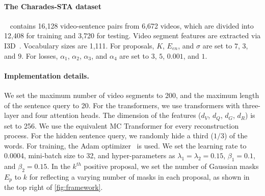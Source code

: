 \paragraph{The Charades-STA dataset}~\cite{gao2017tall}
contains 16,128 video-sentence pairs from 6,672 videos, which are divided into 12,408 for training and 3,720 for testing.
Video segment features are extracted via I3D~\cite{carreira2017quo}.
Vocabulary sizes are 1,111.
For proposals, $K$, $E_{en}$, and $\sigma$ are set to $7$, $3$, and $9$.
For losses, $\alpha_1$, $\alpha_2$, $\alpha_3$, and $\alpha_4$ are set to $3$, $5$, $0.001$, and $1$.

\paragraph{Implementation details.} We set the maximum number of video segments to 200, and the maximum length of the sentence query to 20.
For the transformers, we use transformers with three-layer and four attention heads.
The dimension of the features ($d_V$, $d_Q$, $d_G$, $d_R$) is set to 256.
We use the equivalent MC Transformer for every reconstruction process.
For the hidden sentence query, we randomly hide a third ($1/3$) of the words.
For training, the Adam optimizer~\cite{kingma2014adam} is used.
We set the learning rate to 0.0004, mini-batch size to 32, and hyper-parameters as $\lambda_1=\lambda_2=0.15$, $\beta_1=0.1$, and $\beta_2=0.15$.
In the $k^{th}$ positive proposal, we set the number of Gaussian masks $E_p$ to $k$ for reflecting a varying number of masks in each proposal, as shown in the top right of \cref{fig:framework}.

 



